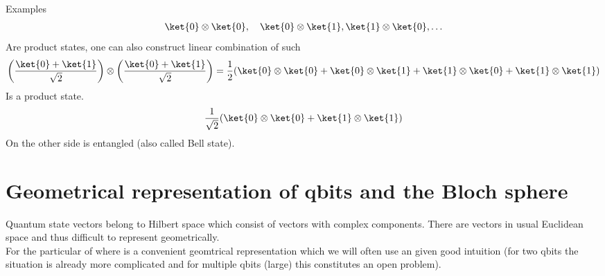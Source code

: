 \begin{parag}{Examples}
    \begin{align*} 
    	\ket{0} \otimes \ket{0}, \mathspace \ket{0} \otimes \ket{1} , \ket{1} \otimes \ket{0}, \ldots
    \end{align*}
	Are product states, one can also construct linear combination of such 
	\begin{align*} 
		\left(\frac{\ket{0} + \ket{1}}{\sqrt{2}}\right) \otimes \left(\frac{\ket{0} + \ket{1}}{\sqrt{2}}\right) = \frac{1}{2}\left(\ket{0} \otimes \ket{0} + \ket{0} \otimes \ket{1} + \ket{1} \otimes \ket{0} + \ket{1} \otimes \ket{1}\right)
	\end{align*}
	Is a product state. 
	\begin{align*} 
		\frac{1}{\sqrt{2}}  \left(\ket{0} \otimes \ket{0} + \ket{1} \otimes \ket{1}\right)
	\end{align*}
	On the other side is entangled (also called Bell state).
\end{parag}


\section{Geometrical representation of qbits and the Bloch sphere}

Quantum state vectors belong to Hilbert space which consist of vectors with complex components. There are  vectors in usual Euclidean space and thus difficult to represent geometrically.\\
For the particular of  where is a convenient geomtrical representation which we will often use an given good intuition (for two qbits the situation is already more complicated and for multiple qbits (large) this constitutes an open problem).


